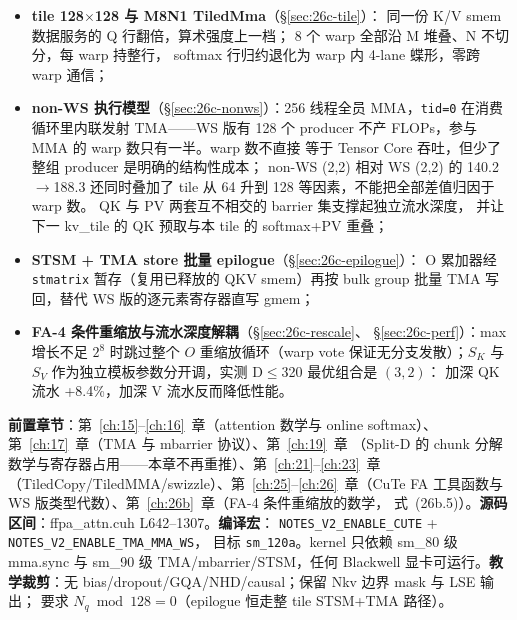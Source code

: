 \begin{itemize}[itemsep=1pt,topsep=2pt]
  \item \textbf{tile 128$\times$128 与 M8N1 TiledMma}（\S\ref{sec:26c-tile}）：
        同一份 K/V smem 数据服务的 Q 行翻倍，算术强度上一档；
        8 个 warp 全部沿 M 堆叠、N 不切分，每 warp 持整行，
        softmax 行归约退化为 warp 内 4-lane 蝶形，零跨 warp 通信；
  \item \textbf{non-WS 执行模型}（\S\ref{sec:26c-nonws}）：256 线程全员
        MMA，\texttt{tid=0} 在消费循环里内联发射 TMA——WS 版有 128 个
        producer 不产 FLOPs，参与 MMA 的 warp 数只有一半。warp 数不直接
        等于 Tensor Core 吞吐，但少了整组 producer 是明确的结构性成本；
        non-WS (2,2) 相对 WS (2,2) 的 140.2$\to$188.3 还同时叠加了
        tile 从 64 升到 128 等因素，不能把全部差值归因于 warp 数。
        QK 与 PV 两套互不相交的 barrier 集支撑起独立流水深度，
        并让下一 kv\_tile 的 QK 预取与本 tile 的 softmax+PV 重叠；
  \item \textbf{STSM + TMA store 批量 epilogue}（\S\ref{sec:26c-epilogue}）：
        O 累加器经 \texttt{stmatrix} 暂存（复用已释放的 QKV smem）再按
        bulk group 批量 TMA 写回，替代 WS 版的逐元素寄存器直写 gmem；
  \item \textbf{FA-4 条件重缩放与流水深度解耦}（\S\ref{sec:26c-rescale}、
        \S\ref{sec:26c-perf}）：max 增长不足 $2^8$ 时跳过整个
        $O$ 重缩放循环（warp vote 保证无分支发散）；$S_K$ 与 $S_V$
        作为独立模板参数分开调，实测 D$\le$320 最优组合是 $(3,2)$：
        加深 QK 流水 +8.4\%，加深 V 流水反而降低性能。
\end{itemize}

\textbf{前置章节}：第~\ref{ch:15}--\ref{ch:16}~章（attention 数学与 online
softmax）、第~\ref{ch:17}~章（TMA 与 mbarrier 协议）、第~\ref{ch:19}~章
（Split-D 的 chunk 分解数学与寄存器占用——本章不再重推）、第~\ref{ch:21}--\ref{ch:23}~章
（TiledCopy/TiledMMA/swizzle）、第~\ref{ch:25}--\ref{ch:26}~章（CuTe FA
工具函数与 WS 版类型代数）、第~\ref{ch:26b}~章（FA-4 条件重缩放的数学，
式~(26b.5)）。\textbf{源码区间}：ffpa\_attn.cuh L642--1307。\textbf{编译宏}：
\texttt{NOTES\_\allowbreak{}V2\_\allowbreak{}ENABLE\_\allowbreak{}CUTE} +
\texttt{NOTES\_\allowbreak{}V2\_\allowbreak{}ENABLE\_\allowbreak{}TMA\_\allowbreak{}MMA\_\allowbreak{}WS}，
目标 \texttt{sm\_120a}。kernel 只依赖 sm\_80 级 mma.sync 与 sm\_90 级
TMA/mbarrier/STSM，任何 Blackwell 显卡可运行。\textbf{教学裁剪}：无
bias/dropout/GQA/NHD/causal；保留 Nkv 边界 mask 与 LSE 输出；
要求 $N_q \bmod 128 = 0$（epilogue 恒走整 tile STSM+TMA 路径）。


